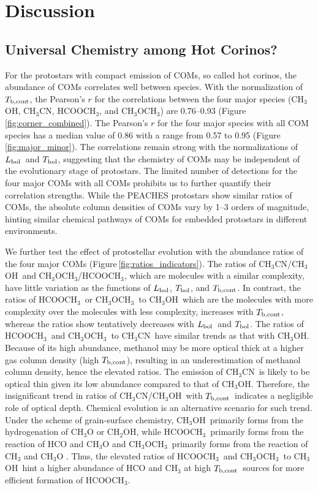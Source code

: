 \documentclass[twocolumn]{aastex62}
\newcommand{\lbol}{\mbox{$L_{\rm bol}$}}
\newcommand{\tbol}{\mbox{$T_{\rm bol}$}}
\newcommand{\tbc}{\mbox{$T_{\rm b, cont}$}}
\newcommand{\methylformate}{\mbox{HCOOCH$_{3}$}}
\newcommand{\methanol}{\mbox{CH$_{3}$OH}}
\newcommand{\dimethylether}{\mbox{CH$_{3}$OCH$_{3}$}}
\newcommand{\methylcyanide}{\mbox{CH$_{3}$CN}}
\begin{document}
\section{Discussion}
\label{sec:discussion}
\subsection{Universal Chemistry among Hot Corinos?}
For the protostars with compact emission of COMs, so called hot corinos, the abundance of COMs correlates well between species.  With the normalization of \tbc, the Pearson's $r$ for the correlations between the four major species (\methanol, \methylcyanide, \methylformate, and \dimethylether) are 0.76--0.93 (Figure\,\ref{fig:corner_combined}).  The Pearson's $r$ for the four major species with all COM species has a median value of 0.86 with a range from 0.57 to 0.95 (Figure\,\ref{fig:major_minor}).  The correlations remain strong with the normalizations of \lbol\ and \tbol, suggesting that the chemistry of COMs may be independent of the evolutionary stage of protostars.  The limited number of detections for the four major COMs with all COMs prohibits us to further quantify their correlation strengths.  While the PEACHES protostars show similar ratios of COMs, the absolute column densities of COMs vary by 1--3 orders of magnitude, hinting similar chemical pathways of COMs for embedded protostars in different environments.

We further test the effect of protostellar evolution with the abundance ratios of the four major COMs (Figure\,\ref{fig:ratios_indicators}).  The ratios of \methylcyanide/\methanol\ and \dimethylether/\methylformate, which are molecules with a similar complexity, have little variation as the functions of \lbol, \tbol, and \tbc.  In contrast, the ratios of \methylformate\ or \dimethylether\ to \methanol\, which are the molecules with more complexity over the molecules with less complexity, increases with \tbc, whereas the ratios show tentatively decreases with \lbol\ and \tbol.  The ratios of \methylformate\ and \dimethylether\ to \methylcyanide\ have similar trends as that with \methanol.  Because of its high abundance, methanol may be more optical thick at a higher gas column density (high \tbc), resulting in an underestimation of methanol column density, hence the elevated ratios.  The emission of \methylcyanide\ is likely to be optical thin given its low abundance compared to that of \methanol.  Therefore, the insignificant trend in ratios of \methylcyanide/\methanol\ with \tbc\ indicates a negligible role of optical depth.  Chemical evolution is an alternative scenario for such trend.  Under the scheme of grain-surface chemistry, \methanol\ primarily forms from the hydrogenation of CH$_3$O or CH$_2$OH, while \methylformate\ primarily forms from the reaction of HCO and CH$_3$O and \dimethylether\ primarily forms from the reaction of CH$_3$ and CH$_3$O \citep{2008ApJ...682..283G}.  Thus, the elevated ratios of \methylformate\ and \dimethylether\ to \methanol\ hint a higher abundance of HCO and CH$_3$ at high \tbc\ sources for more efficient formation of \methylformate.
\end{document}

